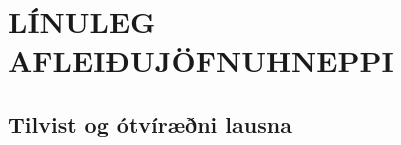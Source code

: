 \newenvironment{se}{\begin{setning+}\sl}{\hfill$\square$\end{setning+}\rm}
\newenvironment{sex}{\begin{setning+}\sl}{\hfill$\blacksquare$\end{setning+}\rm}
\newenvironment{sk}{\begin{skilgreining+}\rm}{\hfill$\square$\end{skilgreining+}\rm}
\newenvironment{sesk}{\begin{setningogskilgreining+}\rm}{\hfill$\square$\end{setningogskilgreining+}\rm}
\newenvironment{hs}{\begin{hjalparsetning+}\sl}{\hfill$\square$\end{hjalparsetning+}\rm}
\newenvironment{fs}{\begin{fylgisetning+}\sl}{\hfill$\square$\end{fylgisetning+}\rm}
\newenvironment{sy}{\begin{synidaemi+}\rm}{\hfill$\square$\end{synidaemi+}\rm}
\newenvironment{fo}{\begin{forrit+}\rm}{\hfill\end{forrit+}\rm}
\newenvironment{so}{\medbreak\noindent{\it Sönnun:}\rm}{\hfill$\blacksquare$\rm}
\newenvironment{sotx}[1]{\medbreak\noindent{\it #1:}\rm}{\hfill$\blacksquare$\rm}
\newcommand{\aefing}{\section{Æfingardæmi} \setcounter{daemateljari}{1}}
\newcommand{\daemi}{
{\medskip\noindent{\bf \thedaemateljari.}}
\addtocounter{daemateljari}{1}
}

\def\svar#1{\smallskip\noindent{\bf #1.} \ }
\def\lausn#1{\smallskip\noindent{\bf #1.} \ }
\def\ugrein#1{\medbreak\noindent{\bf #1.} }
\newcommand{\samantekt}{\noindent{\bf Samantekt.} }

%
%
%

\chapter{LÍNULEG AFLEIÐUJÖFNUHNEPPI}


\section {Tilvist og ótvíræðni lausna}


